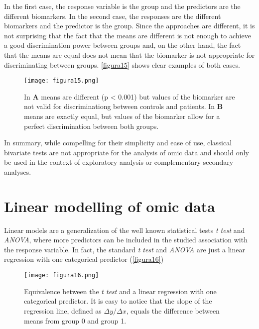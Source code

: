 In the first case, the response variable is the group and the predictors are the different biomarkers. In the second case, the responses are the different biomarkers and the predictor is the group. Since the approaches are different, it is not surprising that the fact that the means are different is not enough to achieve a good discrimination power between groups and, on the other hand, the fact that the means are equal does not mean that the biomarker is not appropriate for discriminating between groups. \autoref{figura15} shows clear examples of both cases.

\begin{figure}[hbtp]
	\centering
\texttt{[image: figura15.png]}
\caption[Difference between having different means and discrimination power]{In \textbf{A} means are different (p < 0.001) but values of the biomarker are not valid for discriminationg between controls and patients. In \textbf{B} means are exactly equal, but values of the biomarker allow for a perfect discrimination between both groups.}
\label{figura15}
\end{figure}

In summary, while compelling for their simplicity and ease of use, classical bivariate tests are not appropriate for the analysis of omic data and should only be used in the context of exploratory analysis or complementary secondary analyses.

\section{Linear modelling of omic data}
\label{linearmodels}
Linear models are a generalization of the well known statistical tests \textit{t test} and \textit{ANOVA}, where more predictors can be included in the studied association with the response variable. In fact, the standard \textit{t test} and \textit{ANOVA} are just a linear regression with one categorical predictor (\autoref{figura16})

\begin{figure}[hbtp]
	\centering
\texttt{[image: figura16.png]}
\caption[Equivalence between the \textit{t test} and a linear regression with one categorical predictor]{Equivalence between the \textit{t test} and a linear regression with one categorical predictor. It is easy to notice that the slope of the regression line, defined as $\Delta y/\Delta x$, equals the difference between means from group 0 and group 1.}
\label{figura16}
\end{figure}

